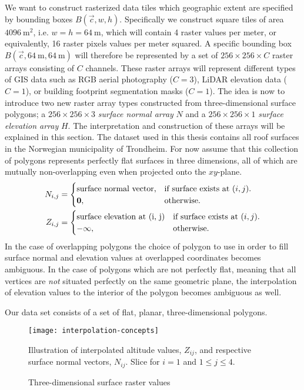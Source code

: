 We want to construct rasterized data tiles which geographic extent are specified by bounding boxes $B(\vec{c}, w, h)$.
Specifically we construct square tiles of area $\SI{4096}{\meter\squared}$, i.e. $w = h = \SI{64}{\meter}$, which will contain \num{4} raster values per meter, or equivalently, \num{16} raster pixels values per meter squared.
A specific bounding box $B(\vec{c}, \SI{64}{\meter}, \SI{64}{\meter})$ will therefore be represented by a set of $256 \times 256 \times C$ raster arrays consisting of $C$ channels.
These raster arrays will represent different types of GIS data such as RGB aerial photography ($C = 3$), LiDAR elevation data ($C = 1$), or building footprint segmentation masks ($C = 1$).
The idea is now to introduce two new raster array types constructed from three-dimensional surface polygons; a $256 \times 256 \times 3$ \textit{surface normal array} $N$ and a $256 \times 256 \times 1$ \textit{surface elevation array} $H$.
The interpretation and construction of these arrays will be explained in this section.
The dataset used in this thesis contains all roof surfaces in the Norwegian municipality of Trondheim.
For now assume that this collection of polygons represents perfectly flat surfaces in three dimensions, all of which are mutually non-overlapping even when projected onto the $xy$-plane.
%
\begin{align*}
  N_{i,j} &= \begin{cases}
    \text{surface normal vector,} &\text{if surface exists at } (i, j).\\
    \vec{0}, &\text{otherwise.}
  \end{cases}
  \\
  Z_{i,j} &= \begin{cases}
    \text{surface elevation at } $(i, j)$ &\text{if surface exists at } (i, j).\\
    -\infty, &\text{otherwise.}
  \end{cases}
\end{align*}
%
In the case of overlapping polygons the choice of polygon to use in order to fill surface normal and elevation values at overlapped coordinates becomes ambiguous.
In the case of polygons which are not perfectly flat, meaning that all vertices are \emph{not} situated perfectly on the same geometric plane, the interpolation of elevation values to the interior of the polygon becomes ambiguous as well.

Our data set consists of a set of flat, planar, three-dimensional polygons.

\begin{figure}
  \centering
  \texttt{[image: interpolation-concepts]}
  \caption{Three-dimensional surface raster values}{%
    Illustration of interpolated altitude values, $Z_{ij}$, and respective surface normal vectors, $N_{ij}$.
    Slice for $i = 1$ and $1 \leq j \leq 4$.
  }
\end{figure}

